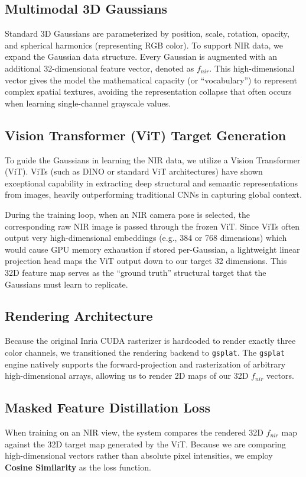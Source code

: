 \documentclass[12pt]{article}
\begin{document}
\subsection{Multimodal 3D Gaussians}
Standard 3D Gaussians are parameterized by position, scale, rotation, opacity, and spherical harmonics (representing RGB color). To support NIR data, we expand the Gaussian data structure. Every Gaussian is augmented with an additional 32-dimensional feature vector, denoted as $f_{nir}$. This high-dimensional vector gives the model the mathematical capacity (or ``vocabulary'') to represent complex spatial textures, avoiding the representation collapse that often occurs when learning single-channel grayscale values.

\subsection{Vision Transformer (ViT) Target Generation}
To guide the Gaussians in learning the NIR data, we utilize a Vision Transformer (ViT). ViTs (such as DINO or standard ViT architectures) have shown exceptional capability in extracting deep structural and semantic representations from images, heavily outperforming traditional CNNs in capturing global context.

During the training loop, when an NIR camera pose is selected, the corresponding raw NIR image is passed through the frozen ViT. Since ViTs often output very high-dimensional embeddings (e.g., 384 or 768 dimensions) which would cause GPU memory exhaustion if stored per-Gaussian, a lightweight linear projection head maps the ViT output down to our target 32 dimensions. This 32D feature map serves as the ``ground truth'' structural target that the Gaussians must learn to replicate.

\subsection{Rendering Architecture}
Because the original Inria CUDA rasterizer is hardcoded to render exactly three color channels, we transitioned the rendering backend to \texttt{gsplat}. The \texttt{gsplat} engine natively supports the forward-projection and rasterization of arbitrary high-dimensional arrays, allowing us to render 2D maps of our 32D $f_{nir}$ vectors.

\subsection{Masked Feature Distillation Loss}
When training on an NIR view, the system compares the rendered 32D $f_{nir}$ map against the 32D target map generated by the ViT. 
Because we are comparing high-dimensional vectors rather than absolute pixel intensities, we employ \textbf{Cosine Similarity} as the loss function. 
\end{document}
